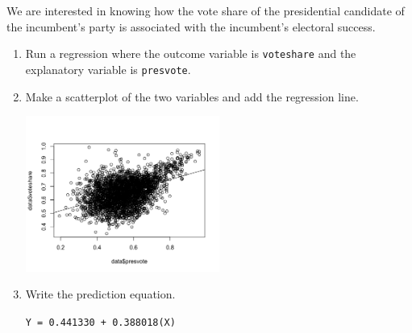 \documentclass[12pt,letterpaper]{article}
\begin{document}
\noindent We are interested in knowing how the vote share of the presidential candidate of the incumbent's party is associated with the incumbent's electoral success.
	\vspace{.25cm}
	\begin{enumerate}
		\item Run a regression where the outcome variable is \texttt{voteshare} and the explanatory variable is \texttt{presvote}.
			
		\vspace{1cm}
		\item Make a scatterplot of the two variables and add the regression line. 
		
		\vspace{1cm}
		\includegraphics[width=0.5\textwidth]{Q3_Rplot.png}
		\vspace{1cm}
		\item Write the prediction equation.
		
		\texttt{Y = 0.441330 + 0.388018(X)}
	\end{enumerate}
	

\newpage	
\end{document}
